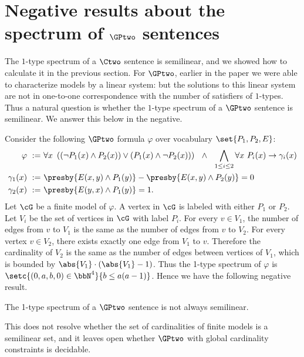 \section{Negative results about the spectrum of $\GPtwo$ sentences} \label{sec:gptwocounter}
The $1$-type spectrum of a $\Ctwo$ sentence is semilinear, and we showed how to calculate it in
the previous section. For $\GPtwo$, earlier in the paper we were able to characterize models by a linear system: but the solutions
to this linear system are not in one-to-one correspondence with the number of satisfiers of $1$-types.
Thus a natural question is whether the $1$-type spectrum of a $\GPtwo$ sentence is semilinear. We answer this below in
the negative.

Consider the following $\GPtwo$ formula $\varphi$ over vocabulary $\set{P_1, P_2, E}$:
\begin{equation*}
    \begin{aligned}
        \varphi\ :=\ &
        \forall x\ 
        \left(
            \left(\neg P_1(x) \land P_2(x)\right) \lor
            \left(P_1(x) \land \neg P_2(x)\right)
        \right)
        \ \ \land \ \ 
        \bigwedge_{1 \le i \le 2} \forall x\ P_i(x) \to \gamma_i(x) \\
        \gamma_1(x)\ :=\ &
        \presby{E(x, y) \land P_1(y)} - \presby{E(x, y) \land P_2(y)} = 0 \\
        \gamma_2(x)\ :=\ &
        \presby{E(y, x) \land P_1(y)} = 1.
    \end{aligned}
\end{equation*}
Let $\cG$ be a finite model of $\varphi$.
A vertex in $\cG$ is labeled with either $P_1$ or $P_2$.
Let $V_i$ be the set of vertices in $\cG$ with label $P_i$.
For every $v \in V_1$, the number of edges from $v$ to $V_1$
is the same as the number of edges from $v$ to $V_2$.
For every vertex $v \in V_2$, there exists exactly one edge from $V_1$ to $v$.
Therefore the cardinality of $V_2$ is the same as the number of edges between vertices of $V_1$,
which is bounded by $\abs{V_1}\cdot(\abs{V_1}-1)$.
Thus the 1-type spectrum of $\varphi$ is $\setc{(0, a, b, 0) \in \bbN^4}{b \le a(a-1)}$.
Hence we have the following negative result.
\begin{theorem}
    The 1-type spectrum of a $\GPtwo$ sentence is not always semilinear.
\end{theorem}

This does not resolve whether the set of cardinalities of finite models is a semilinear set, and
it leaves open whether $\GPtwo$ with global cardinality constraints is decidable.
